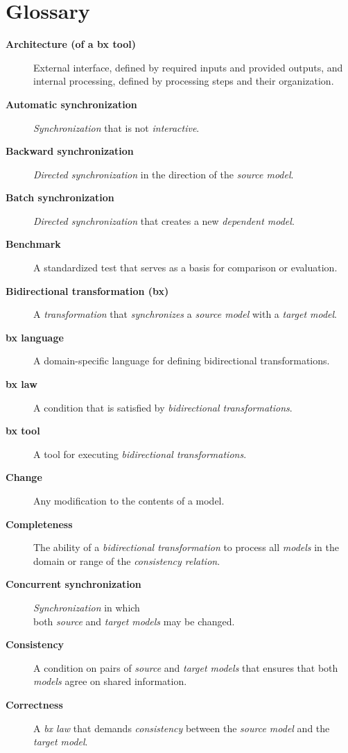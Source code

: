 
\appendix

\section{Glossary}
\label{sec:Glossary}

\begin{description}
	\item[\textbf{Architecture (of a bx tool)}] External interface, defined by required inputs and provided outputs, and internal processing, defined by processing steps and their organization.
	\item[\textbf{Automatic synchronization}] \emph{Synchronization} that is not \emph{interactive}.
	\item[\textbf{Backward synchronization}] \emph{Directed synchronization} in the direction of the \emph{source model}.
	\item[\textbf{Batch synchronization}] \emph{Directed synchronization} that creates a new \emph{dependent model}.
	\item[\textbf{Benchmark}] A standardized test that serves as a basis for comparison or evaluation.
	\item[\textbf{Bidirectional transformation (bx)}] A \emph{transformation} that \emph{synchronizes} a \emph{source model} with a \emph{target model}.
	\item[\textbf{bx language}] A domain-specific language for defining bidirectional transformations.
	\item[\textbf{bx law}] A condition that is satisfied by \emph{bidirectional transformations}.
	\item[\textbf{bx tool}] A tool for executing \emph{bidirectional transformations}.
	\item[\textbf{Change}] Any modification to the contents of a model.
	\item[\textbf{Completeness}] The ability of a \emph{bidirectional transformation} to process all \emph{models} in the domain or range of the \emph{consistency relation}.
	\item[\textbf{Concurrent synchronization}] \emph{Synchronization} in which\\ both \emph{source} and \emph{target models} may be changed.
	\item[\textbf{Consistency}] A condition on pairs of \emph{source} and \emph{target models} that ensures that both \emph{models} agree on shared information.
	\item[\textbf{Correctness}] A \emph{bx law} that demands \emph{consistency} between the \emph{source model} and the \emph{target model}. 

\end{description}
